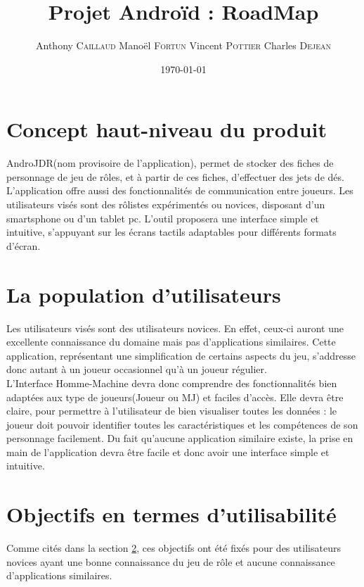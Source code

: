 ﻿\documentclass[11pt,a4paper]{article}
\title{Projet Androïd : RoadMap}
\author{Anthony \textsc{Caillaud} Manoël \textsc{Fortun} Vincent
\textsc{Pottier} Charles \textsc{Dejean}}
\date{\today}
\begin{document}
\maketitle

\clearpage
\tableofcontents
\clearpage
\section{Concept haut-niveau du produit}

AndroJDR(nom provisoire de l'application), permet de stocker des fiches de
personnage de jeu de rôles, et à partir de ces fiches, d'effectuer des jets de
dés. L'application offre aussi des fonctionnalités de communication entre
joueurs. Les utilisateurs visés sont des rôlistes expérimentés ou novices,
disposant d'un smartsphone ou d'un tablet pc. L'outil proposera une interface
simple et intuitive, s'appuyant sur les écrans tactils adaptables pour
différents formats d'écran.

\section{La population d'utilisateurs}
\label{utilisateurs}

Les utilisateurs visés sont des utilisateurs novices. En effet, ceux-ci auront
une excellente connaissance du domaine mais pas d'applications similaires.
Cette application, représentant une simplification de certains aspects du jeu,
s'addresse donc autant à un joueur occasionnel qu'à un joueur régulier.\\

L'Interface Homme-Machine devra donc comprendre des fonctionnalités bien
adaptées aux type de joueurs(Joueur ou MJ) et faciles d'accès. Elle devra être
claire, pour permettre à l'utilisateur de bien visualiser toutes les données
: le joueur doit pouvoir identifier toutes les caractéristiques et les
compétences de son personnage facilement. Du fait qu'aucune application
similaire existe, la prise en main de l'application devra être facile et donc avoir une interface
simple et intuitive.


\section{Objectifs en termes d'utilisabilité}

Comme cités dans la section \ref{utilisateurs}, ces objectifs ont été fixés pour
des utilisateurs novices ayant une bonne connaissance du jeu de rôle et aucune
connaissance d'applications similaires.\\
\end{document}
